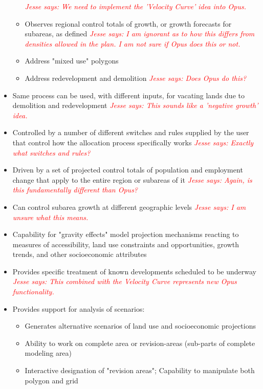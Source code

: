 \documentclass[titlepage]{article}
\begin{document}
\begin{itemize}
\begin{itemize}
				\textcolor{red}{\textit{Jesse says: We need to implement the 'Velocity Curve' idea into Opus.}}
			\item Observes regional control totals of growth, or growth forecasts for subareas, as defined
				\textcolor{red}{\textit{Jesse says: I am ignorant as to how this differs from densities allowed in the plan.  I am not sure if Opus does this or not.}}
			\item Address "mixed use" polygons
			\item Address redevelopment and demolition
				\textcolor{red}{\textit{Jesse says: Does Opus do this?}}
		\end{itemize}
	\item Same process can be used, with different inputs, for vacating lands due to demolition and redevelopment
		\textcolor{red}{\textit{Jesse says: This sounds like a 'negative growth' idea.}}
	\item Controlled by a number of different switches and rules supplied by the user that control how the allocation process specifically works
		\textcolor{red}{\textit{Jesse says: Exactly what switches and rules?}}
	\item Driven by a set of projected control totals of population and employment change that apply to the entire region or subareas of it
		\textcolor{red}{\textit{Jesse says: Again, is this fundamentally different than Opus?}}
	\item Can control subarea growth at different geographic levels
		\textcolor{red}{\textit{Jesse says: I am unsure what this means.}}
	\item Capability for  "gravity effects" model projection mechanisms reacting to measures of accessibility, land use constraints and opportunities, growth trends, and other socioeconomic attributes
	\item Provides specific treatment of known developments scheduled to be underway
		\textcolor{red}{\textit{Jesse says: This combined with the Velocity Curve represents new Opus functionality.}}
	\item Provides support for analysis of scenarios:
		\begin{itemize}
			\item Generates alternative scenarios of land use and socioeconomic projections
			\item Ability to work on complete area or revision-areas (sub-parts of complete modeling area)
			\item Interactive designation of  "revision areas"; Capability to manipulate both polygon and grid

\end{itemize}
\end{itemize}
\end{document}
